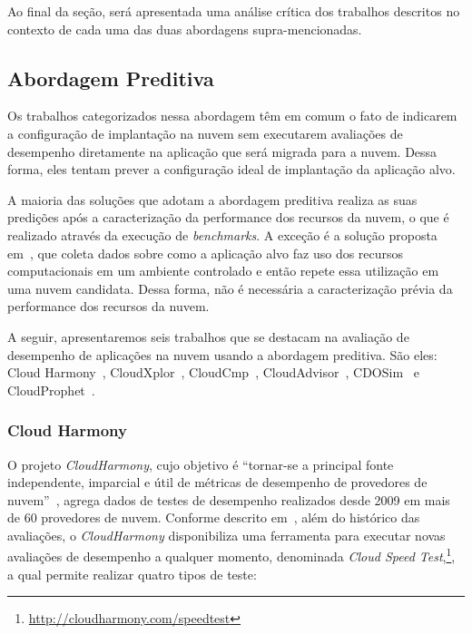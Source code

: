 Ao final da seção, será apresentada uma análise crítica dos trabalhos descritos no contexto de cada uma das duas abordagens supra-mencionadas.

\subsection{Abordagem Preditiva}

Os trabalhos categorizados nessa abordagem têm em comum o fato de
indicarem a configuração de implantação na nuvem sem executarem avaliações de
desempenho diretamente na aplicação que será migrada para a nuvem. Dessa forma,
eles tentam prever a configuração ideal de implantação da aplicação alvo.

A maioria das soluções que adotam a abordagem preditiva realiza as
suas predições após a caracterização da performance dos recursos da nuvem, o que
é realizado através da execução de \textit{benchmarks}. A exceção é a solução proposta em~\cite{li2011cloudprophet}, que coleta dados sobre como a
aplicação alvo faz uso dos recursos computacionais em um ambiente controlado e
então repete essa utilização em uma nuvem candidata. Dessa forma, não é necessária a caracterização prévia da performance dos recursos da nuvem.

A seguir, apresentaremos seis trabalhos que se destacam na avaliação de
desempenho de aplicações na nuvem usando a abordagem preditiva. São
eles: Cloud Harmony~\cite{cloudharmony}, CloudXplor~\cite{malkowski2010cloudxplor}, CloudCmp~\cite{li2011}, CloudAdvisor~\cite{jung2013cloudadvisor}, CDOSim~\cite{fittkau2012cdosim}
e CloudProphet~\cite{li2011cloudprophet}.

\subsubsection{Cloud Harmony}
O projeto {\em CloudHarmony}, cujo
objetivo é ``tornar-se a principal fonte independente, imparcial e útil de
métricas de desempenho de provedores de nuvem''~\cite{cloudharmony}, agrega
dados de testes de desempenho realizados desde 2009 em mais de 60 provedores de
nuvem. Conforme descrito em~\cite{cunha2012ambiente}, além do histórico das
avaliações, o {\em CloudHarmony} disponibiliza uma ferramenta para executar novas avaliações de desempenho a qualquer momento, denominada \textit{Cloud Speed Test},\footnote{\url{http://cloudharmony.com/speedtest}}, a qual permite realizar quatro tipos de teste:

